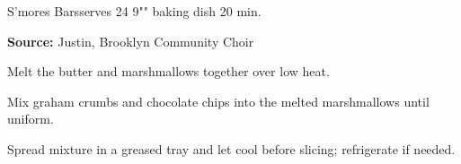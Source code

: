 \begin{recipe}{S'mores Bars}{serves 24}{ \hfill 9"" baking dish \hfill 20 min.}

 \freeform \textbf{Source:} Justin, Brooklyn Community Choir

 Melt the butter and marshmallows together over low heat.

 Mix graham crumbs and chocolate chips into the melted marshmallows until uniform.

 \newstep Spread mixture in a greased tray and let cool before slicing; refrigerate if needed.
\end{recipe}
